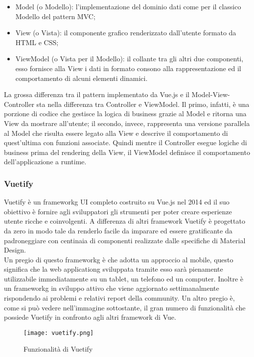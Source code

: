 \begin{itemize}
	\item Model (o Modello): l'implementazione del dominio dati come per il classico Modello del pattern MVC;
	\item View (o Vista): il componente grafico renderizzato dall'utente formato da HTML e CSS;
	\item ViewModel (o Vista per il Modello): il collante tra gli altri due componenti, esso fornisce alla View i dati in formato consono alla rappresentazione ed il comportamento di alcuni elementi dinamici.
\end{itemize}
La grossa differenza tra il pattern implementato da Vue.js e il Model-View-Controller sta nella differenza tra Controller e ViewModel. Il primo, infatti, è una porzione di codice che gestisce la logica di business grazie al Model e ritorna una View da mostrare all'utente; il secondo, invece, rappresenta una versione parallela al Model che risulta essere legato alla View e descrive il comportamento di quest'ultima con funzioni associate. Quindi mentre il Controller esegue logiche di business prima del rendering della View, il ViewModel definisce il comportamento dell'applicazione a runtime.

\subsubsection{Vuetify}
\label{subsubsec:vuetify}

Vuetify è un \gls{frameworkg} UI completo costruito su Vue.js nel 2014 ed il suo obiettivo è fornire agli sviluppatori gli strumenti per poter creare esperienze utente ricche e coinvolgenti. A differenza di altri framework Vuetify è progettato da zero in modo tale da renderlo facile da imparare ed essere gratificante da padroneggiare con centinaia di componenti realizzate dalle specifiche di Material Design.\\
Un pregio di questo \gls{frameworkg} è che adotta un approccio al mobile, questo significa che la \gls{web applicationg} sviluppata tramite esso sarà pienamente utilizzabile immediatamente su un tablet, un telefono ed un computer. Inoltre è un \gls{frameworkg} in sviluppo attivo che viene aggiornato settimanalmente rispondendo ai problemi e relativi report della community. Un altro pregio è, come si può vedere nell'immagine sottostante, il gran numero di funzionalità che possiede Vuetify in confronto agli altri framework di Vue.
\begin{figure}[H]
	\begin{center}
		\texttt{[image: vuetify.png]}
		\caption{Funzionalità di Vuetify}
	\end{center}
\end{figure}

